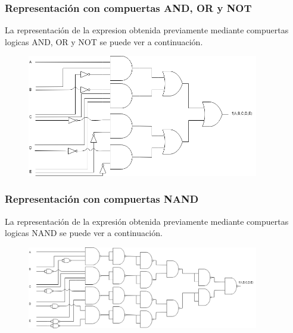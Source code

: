 \subsubsection{Representaci\'on con compuertas AND, OR y NOT}
\noindent
La representaci\'on de la expresion obtenida previamente mediante compuertas logicas AND, OR y NOT se puede ver a continuaci\'on.

\begin{figure}[h!]
    \centering
    \begin{minipage}{0.85\textwidth}
        \centering
        \includegraphics[width=0.9\textwidth]{images/ej2/ej2andornot.png} %
         \label{fig:ej2andornot}
    \end{minipage}\hfill
\end{figure}

\subsubsection{Representaci\'on con compuertas NAND}
\noindent
La representaci\'on de la expresi\'on obtenida previamente mediante compuertas logicas NAND se puede ver a continuaci\'on.

\begin{figure}[H]
    \centering
    \begin{minipage}{0.85\textwidth}
        \centering
        \includegraphics[width=0.9\textwidth]{images/ej2/ej2nand.png} %
         \label{fig:ej2nand}
    \end{minipage}\hfill
\end{figure}